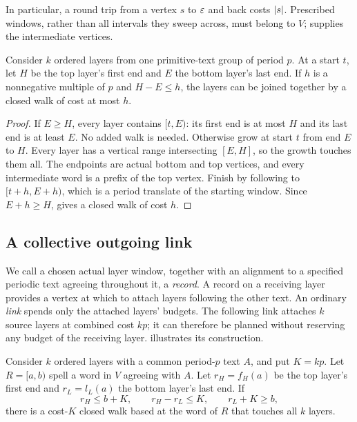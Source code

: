 In particular, a round trip from a vertex $s$ to $\varepsilon$ and back costs $\lvert s\rvert$. Prescribed windows, rather than all intervals they sweep across, must belong to $V$;  supplies the intermediate vertices.

\begin{lemma}\label{lem:band}
Consider $k$ ordered layers from one primitive-text group of period $p$. At a start $t$, let $H$ be the top layer's first end and $E$ the bottom layer's last end. If $h$ is a nonnegative multiple of $p$ and $H-E\le h$, the layers can be joined together by a closed walk of cost at most $h$.
\end{lemma}

\begin{proof}
If $E\ge H$, every layer contains $[t,E)$: its first end is at most $H$ and its last end is at least $E$. No added walk is needed. Otherwise grow at start $t$ from end $E$ to $H$. Every layer has a vertical range intersecting $[E,H]$, so the growth touches them all. The endpoints are actual bottom and top vertices, and every intermediate word is a prefix of the top vertex. Finish by following to $[t+h,E+h)$, which is a period translate of the starting window. Since $E+h\ge H$,  gives a closed walk of cost $h$.
\end{proof}

\subsection{A collective outgoing link}

We call a chosen actual layer window, together with an alignment to a specified periodic text agreeing throughout it, a \emph{record}. A record on a receiving layer provides a vertex at which to attach layers following the other text. An ordinary \emph{link} spends only the attached layers' budgets. The following link attaches $k$ source layers at combined cost $kp$; it can therefore be planned without reserving any budget of the receiving layer.  illustrates its construction.

\begin{lemma}\label{lem:collective}
Consider $k$ ordered layers with a common period-$p$ text $A$, and put $K=kp$. Let $R=[a,b)$ spell a word in $V$ agreeing with $A$. Let $r_H=f_H(a)$ be the top layer's first end and $r_L=l_L(a)$ the bottom layer's last end. If
\begin{equation}\label{eq:collective-conditions}
r_H\le b+K,\qquad r_H-r_L\le K,
\qquad r_L+K\ge b,
\end{equation}
there is a cost-$K$ closed walk based at the word of $R$ that touches all $k$ layers.
\end{lemma}

